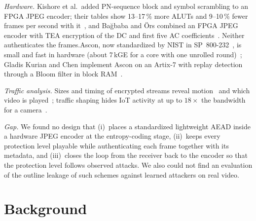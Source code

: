 \documentclass{ieeeaccess}
\newif\ifextended
\begin{document}
\textit{Hardware.} Kishore et al.\ added PN-sequence block and symbol scrambling to an FPGA JPEG encoder\ifextended{} for 256$\times$256 grey images on Stratix~II and~IV; they describe the extra hardware as about 1\,\%, while their tables show\else; their tables show\fi{} 13--17\,\% more ALUTs\ifextended, twice the memory bits\fi{} and 9--10\,\% fewer frames per second with it~\cite{kishore2015}, and Ba\u{g}baba and \"Ors combined an FPGA JPEG encoder with TEA encryption of the DC\ifextended{} coefficients, or of the DC and first five AC coefficients, of every block\else{} and first five AC coefficients\fi~\cite{bagbaba2015}. Neither authenticates the frames.\ifextended{} Qiu et al.\ XOR raw video frames with two one-dimensional chaotic sequences in real time on a satellite payload (a Raspberry Pi~4B) and also implement the maps on an FPGA; their output is neither a compressed stream nor authenticated~\cite{qiu2025}.\fi Ascon, now standardized by NIST in SP~800-232~\cite{sp800232,ascon}, is small and fast in hardware (about 7\,kGE for a core with one unrolled round)~\cite{gross2017}; Gladis Kurian and Chen implement Ascon on an Artix-7 with replay detection through a Bloom filter in block RAM\ifextended, which has no false negatives but a small false-positive rate (0.17\,\% measured)\fi~\cite{kurian2025}.

\textit{Traffic analysis.} Sizes and timing of encrypted streams reveal motion~\cite{wampler2015} and which video is played~\cite{schuster2017}; traffic shaping hides IoT activity at up to $18\times$ the bandwidth for a camera~\cite{apthorpe2019}.

\textit{Gap.} We found no design that (i)~places a standardized lightweight AEAD inside a hardware JPEG encoder at the entropy-coding stage, (ii)~keeps every protection level playable while authenticating each frame together with its metadata, and (iii)~closes the loop from the receiver back to the encoder so that the protection level follows observed attacks. We also could not find an evaluation of the outline leakage of such schemes against learned attackers on real video.

\ifextended
\section{Background}\label{sec:background}
\end{document}
